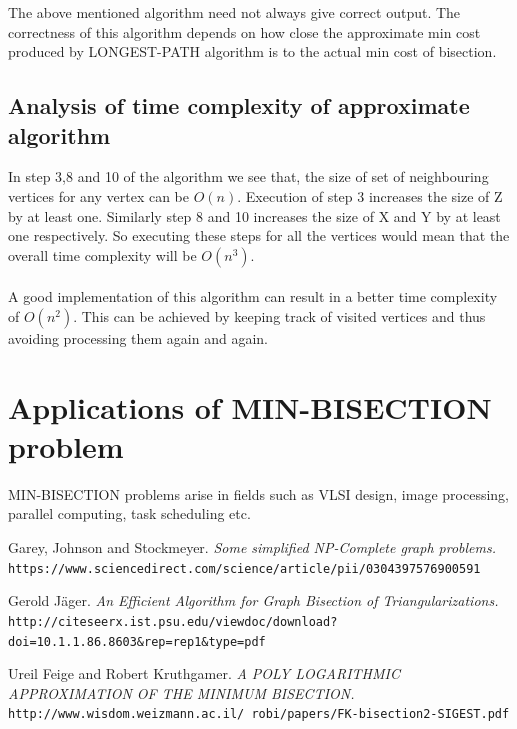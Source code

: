 \documentclass[10pt]{article}
\begin{document}
The above mentioned algorithm need not always give correct output. The correctness of this algorithm depends on how close the approximate min cost produced by LONGEST-PATH algorithm is to the actual min cost of bisection.


\subsection{Analysis of time complexity of approximate algorithm}

In step 3,8 and 10 of the algorithm we see that, the size of set of neighbouring vertices for any vertex can be $O(n)$. Execution of step 3 increases the size of Z by at least one. Similarly step 8 and 10 increases the size of X and Y by at least one respectively. So executing these steps for all the vertices would mean that the overall time complexity will be $O(n^3)$.\\\\
A good implementation of this algorithm can result in a better time complexity of $O(n^2)$. This can be achieved by keeping track of visited vertices and thus avoiding processing them again and again.

\section{Applications of MIN-BISECTION problem}
MIN-BISECTION problems arise in fields such as VLSI design, image processing, parallel computing, task scheduling etc.\cite{examples} 

\newpage
\begin{thebibliography}{9}
Garey, Johnson and Stockmeyer. 
\textit{Some simplified NP-Complete graph problems.} 
\\\texttt{https://www.sciencedirect.com/science/article/pii/0304397576900591}
 
Gerold J\"ager. 
\textit{An Efficient Algorithm for Graph Bisection of Triangularizations.} 
\\\texttt{http://citeseerx.ist.psu.edu/viewdoc/download?doi=10.1.1.86.8603&rep=rep1&type=pdf}
 
Ureil Feige and Robert Kruthgamer.
\textit{A POLY LOGARITHMIC APPROXIMATION OF THE MINIMUM BISECTION.}
\\\texttt{http://www.wisdom.weizmann.ac.il/~robi/papers/FK-bisection2-SIGEST.pdf}
\end{thebibliography}
\end{document}
